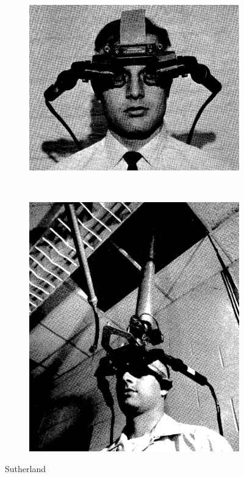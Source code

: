 \documentclass[a4,12pt]{scrartcl}
\begin{document}
\begin{figure}[H]
	\centering
	\begin{subfigure}{.4\textwidth}
	  \centering
	  \includegraphics[width=\linewidth]{sutherland-1}
	\end{subfigure}
	~
	\begin{subfigure}{.4\textwidth}
	  \centering
	  \includegraphics[width=0.8\linewidth]{sutherland-2}
	\end{subfigure}
 	\caption{Sutherland \cite{Sutherland68}}
\end{figure}
\end{document}
